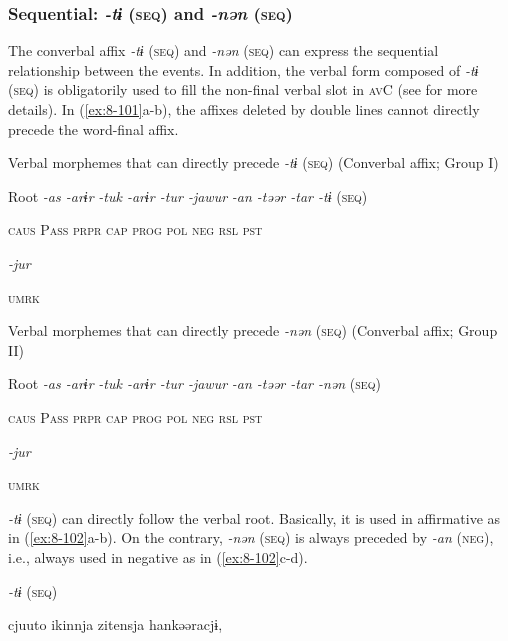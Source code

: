 \subsubsection{Sequential: \textit{{}-tɨ} (\textsc{seq}) and \textit{{}-nən} (\textsc{seq})}

The converbal affix \textit{{}-tɨ} (\textsc{seq}) and \textit{{}-nən} (\textsc{seq}) can express the sequential relationship between the events. In addition, the verbal form composed of \textit{{}-tɨ} (\textsc{seq}) is obligatorily used to fill the non-final verbal slot in \textsc{av}C (see  for more details). In (\ref{ex:8-101}a-b), the affixes deleted by double lines cannot directly precede the word-final affix.

\ea\label{ex:8-101}
\ea Verbal morphemes that can directly precede \textit{{}-tɨ} (\textsc{seq}) (Converbal affix; Group I)

  Root  \textit{{}-as  {}-arɨr} %
\textit{{}-tuk  {}-arɨr  {}-tur  {}-jawur} %
\textit{{}-an  {}-təər  {}-tar  {}-tɨ} (\textsc{seq})

    \textsc{caus}  P\textsc{ass}  \textsc{prpr}  \textsc{cap}  \textsc{prog}  \textsc{pol}  \textsc{neg}  \textsc{rsl}  \textsc{pst}

          \textit{{}-jur} 

          \textsc{umrk}

\ex Verbal morphemes that can directly precede \textit{{}-nən} (\textsc{seq}) (Converbal affix; Group II)

  Root  \textit{{}-as  {}-arɨr} %
\textit{{}-tuk  {}-arɨr  {}-tur  {}-jawur} %
\textit{{}-an  {}-təər  {}-tar  {}-nən} (\textsc{seq})

    \textsc{caus}  P\textsc{ass}  \textsc{prpr}  \textsc{cap}  \textsc{prog}  \textsc{pol}  \textsc{neg}  \textsc{rsl}  \textsc{pst}

          \textit{{}-jur} 

          \textsc{umrk}

\textit{{}-tɨ} (\textsc{seq}) can directly follow the verbal root. Basically, it is used in affirmative as in (\ref{ex:8-102}a-b). On the contrary, \textit{{}-nən} (\textsc{seq}) is always preceded by \textit{{}-an} (\textsc{neg}), i.e., always used in negative as in (\ref{ex:8-102}c-d).

\ea\label{ex:8-102}
  \textit{{}-tɨ} (\textsc{seq})

\ea {\TM}
\glll  cjuuto  ikinnja  {\textbar}zitensja{\textbar}  hankəəracjɨ,

